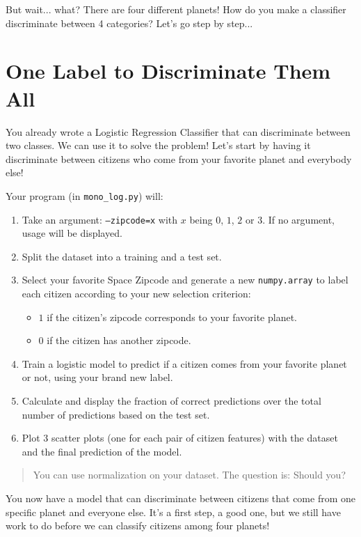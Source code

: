 But wait... what? There are four different planets! How do you make a classifier discriminate between 4 categories? Let's go step by step...


\section*{One Label to Discriminate Them All}
You already wrote a Logistic Regression Classifier that can discriminate between two classes.
We can use it to solve the problem!
Let's start by having it discriminate between citizens who come from your favorite planet and everybody else!

Your program (in \texttt{mono\_log.py}) will:
\begin{enumerate}
  \item Take an argument: \texttt{--zipcode=x} with $x$ being $0$, $1$, $2$ or $3$.
        If no argument, usage will be displayed.
  \item Split the dataset into a training and a test set.
  \item Select your favorite Space Zipcode and generate a new \texttt{numpy.array} to label each citizen according to your new selection criterion:
  \begin{itemize}
    \item $1$ if the citizen's zipcode corresponds to your favorite planet.
    \item $0$ if the citizen has another zipcode.
  \end{itemize}
  \item Train a logistic model to predict if a citizen comes from your favorite planet or not, using your brand new label.
  \item Calculate and display the fraction of correct predictions over the total number of predictions based on the test set.
  \item Plot 3 scatter plots (one for each pair of citizen features) with the dataset and the final prediction of the model.
\end{enumerate}

\begin{quote}
  You can use normalization on your dataset. The question is: Should you?
\end{quote}

You now have a model that can discriminate between citizens that come from one specific planet and everyone else.
It's a first step, a good one, but we still have work to do before we can classify citizens among four planets!


